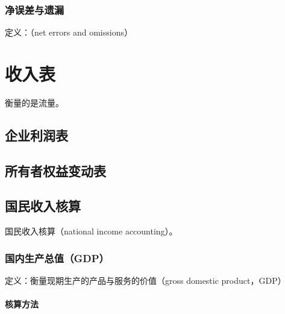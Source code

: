 \documentclass[12pt]{book}
\begin{document}
\subsection{净误差与遗漏}

定义：（net errors and omissions）






\chapter{收入表}

衡量的是流量。

\section{企业利润表}


\section{所有者权益变动表}


\section{国民收入核算}


国民收入核算（national income accounting）。


\subsection{国内生产总值（GDP）}

定义：衡量现期生产的产品与服务的价值（gross domestic product，GDP）




\subsubsection{核算方法}
\end{document}
